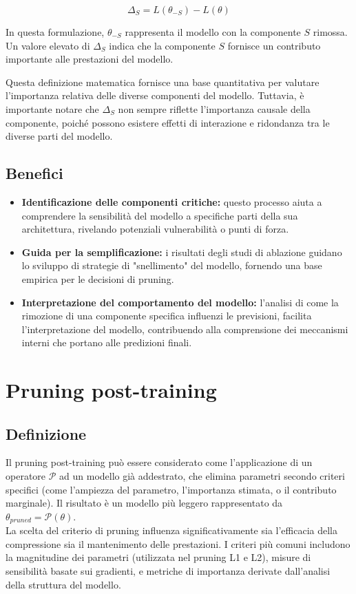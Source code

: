 \documentclass[a4paper,12pt]{report}
\begin{document}
	\[
	\Delta_S = L(\theta_{-S}) - L(\theta)
	\]
	
	In questa formulazione, $\theta_{-S}$ rappresenta il modello con la componente $S$ rimossa. Un valore elevato di $\Delta_S$ indica che la componente $S$ fornisce un contributo importante alle prestazioni del modello.
	
	Questa definizione matematica fornisce una base quantitativa per valutare l'importanza relativa delle diverse componenti del modello. Tuttavia, è importante notare che $\Delta_S$ non sempre riflette l'importanza causale della componente, poiché possono esistere effetti di interazione e ridondanza tra le diverse parti del modello.
	
	\subsection{Benefici}
	\begin{itemize}
		\item \textbf{Identificazione delle componenti critiche:} questo processo aiuta a comprendere la sensibilità del modello a specifiche parti della sua architettura, rivelando potenziali vulnerabilità o punti di forza.
		\item \textbf{Guida per la semplificazione:} i risultati degli studi di ablazione guidano lo sviluppo di strategie di "snellimento" del modello, fornendo una base empirica per le decisioni di pruning.
		\item \textbf{Interpretazione del comportamento del modello:} l'analisi di come la rimozione di una componente specifica influenzi le previsioni, facilita l'interpretazione del modello, contribuendo alla comprensione dei meccanismi interni che portano alle predizioni finali.
	\end{itemize}
	
	\section{Pruning post-training}
	
	\subsection{Definizione}
	Il pruning post-training può essere considerato come l'applicazione di un operatore $\mathcal{P}$ ad un modello già addestrato, che elimina parametri secondo criteri specifici (come l'ampiezza del parametro, l'importanza stimata, o il contributo marginale). Il risultato è un modello più leggero rappresentato da $\theta_{pruned} = \mathcal{P}(\theta)$. \\
	La scelta del criterio di pruning influenza significativamente sia l'efficacia della compressione sia il mantenimento delle prestazioni. I criteri più comuni includono la magnitudine dei parametri (utilizzata nel pruning L1 e L2), misure di sensibilità basate sui gradienti, e metriche di importanza derivate dall'analisi della struttura del modello.
	
\end{document}
